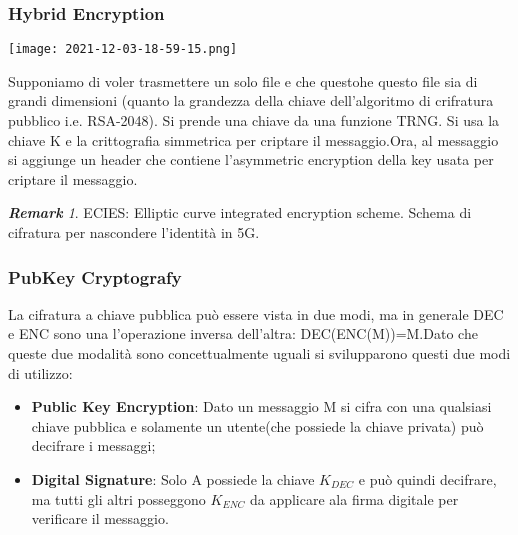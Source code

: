 \documentclass{article}
\theoremstyle{remark}
\newtheorem*{remark}{\textbf{Remark}}
\begin{document}
\subsubsection{Hybrid Encryption}
\begin{center}
    \texttt{[image: 2021-12-03-18-59-15.png]}
\end{center}
Supponiamo di voler trasmettere un solo file e che questohe questo file sia di grandi dimensioni (quanto la grandezza della chiave dell'algoritmo di crifratura pubblico i.e. RSA-2048). Si prende una chiave da una funzione TRNG. Si usa la chiave K e la crittografia simmetrica per criptare il messaggio.\newline Ora, al messaggio si aggiunge un header che contiene l'asymmetric encryption della key usata per criptare il messaggio.
\begin{remark}
    ECIES: Elliptic curve integrated encryption scheme. Schema di cifratura per nascondere l'identità in 5G.
\end{remark}
\subsubsection{PubKey Cryptografy}
La cifratura a chiave pubblica può essere vista in due modi, ma in generale DEC e ENC sono una l'operazione inversa dell'altra: DEC(ENC(M))=M.\newline Dato che queste due modalità sono concettualmente uguali si svilupparono questi due modi di utilizzo:\begin{itemize}
    \item \textbf{Public Key Encryption}: Dato un messaggio M si cifra con una qualsiasi chiave pubblica e solamente un utente(che possiede la chiave privata) può decifrare i messaggi;
    \item \textbf{Digital Signature}: Solo A possiede la chiave \(K_{DEC}\) e può quindi decifrare, ma tutti gli altri posseggono \(K_{ENC}\) da applicare ala firma digitale per verificare il messaggio.
\end{itemize}
\end{document}
